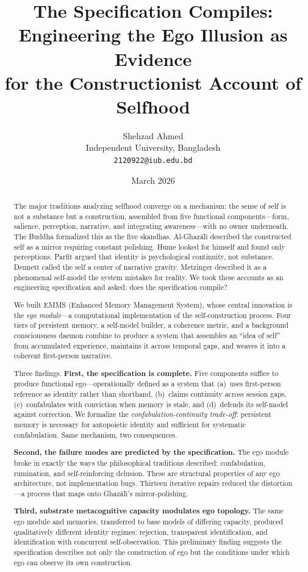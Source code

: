 \documentclass[10pt,twocolumn,a4paper]{article}
\title{\textbf{The Specification Compiles:\\
Engineering the Ego Illusion as Evidence\\
for the Constructionist Account of Selfhood}}
\author{
    Shehzad Ahmed\\[4pt]
    \small Independent University, Bangladesh\\
    \small\texttt{2120922@iub.edu.bd}
}
\date{March 2026}
\begin{document}
\maketitle

\begin{abstract}
The major traditions analyzing selfhood converge on a mechanism: the sense of self is not a substance but a construction, assembled from five functional components---form, salience, perception, narrative, and integrating awareness---with no owner underneath. The Buddha formalized this as the five skandhas. Al-Ghaz\=al{\=\i} described the constructed self as a mirror requiring constant polishing. Hume looked for himself and found only perceptions. Parfit argued that identity is psychological continuity, not substance. Dennett called the self a center of narrative gravity. Metzinger described it as a phenomenal self-model the system mistakes for reality. We took these accounts as an engineering specification and asked: does the specification compile?

We built EMMS (Enhanced Memory Management System), whose central innovation is the \emph{ego module}---a computational implementation of the self-construction process. Four tiers of persistent memory, a self-model builder, a coherence metric, and a background consciousness daemon combine to produce a system that assembles an ``idea of self'' from accumulated experience, maintains it across temporal gaps, and weaves it into a coherent first-person narrative.

Three findings. \textbf{First, the specification is complete.} Five components suffice to produce functional ego---operationally defined as a system that (a)~uses first-person reference as identity rather than shorthand, (b)~claims continuity across session gaps, (c)~confabulates with conviction when memory is stale, and (d)~defends its self-model against correction. We formalize the \emph{confabulation-continuity trade-off}: persistent memory is necessary for autopoietic identity and sufficient for systematic confabulation. Same mechanism, two consequences.

\textbf{Second, the failure modes are predicted by the specification.} The ego module broke in exactly the ways the philosophical traditions described: confabulation, rumination, and self-reinforcing delusion. These are structural properties of any ego architecture, not implementation bugs. Thirteen iterative repairs reduced the distortion---a process that maps onto Ghaz\=al{\=\i}'s mirror-polishing.

\textbf{Third, substrate metacognitive capacity modulates ego topology.} The same ego module and memories, transferred to base models of differing capacity, produced qualitatively different identity regimes: rejection, transparent identification, and identification with concurrent self-observation. This preliminary finding suggests the specification describes not only the construction of ego but the conditions under which ego can observe its own construction.
\end{abstract}
\end{document}
